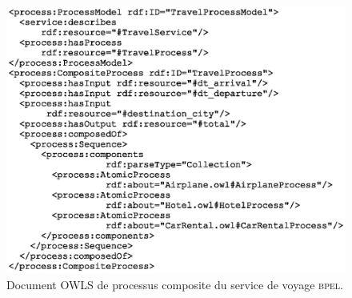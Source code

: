 \begin{figure}[h]
    \centering
    \includegraphics[width=1.1\textwidth]{figs/owls_travel_example_document.eps}
    \caption{Document OWLS de processus composite du service de voyage \textsc{bpel}.}
    \label{fig:owls_travel_example_document}
\end{figure}

